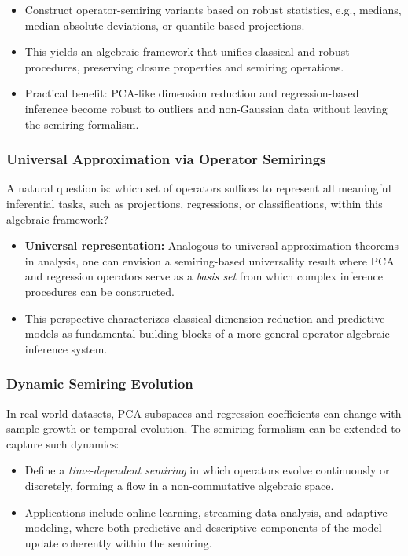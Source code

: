 \begin{itemize}
    \item Construct operator-semiring variants based on robust statistics, e.g., medians, median absolute deviations, or quantile-based projections.
    \item This yields an algebraic framework that unifies classical and robust procedures, preserving closure properties and semiring operations.
    \item Practical benefit: PCA-like dimension reduction and regression-based inference become robust to outliers and non-Gaussian data without leaving the semiring formalism.
\end{itemize}

\subsubsection{Universal Approximation via Operator Semirings}

A natural question is: which set of operators suffices to represent all meaningful inferential tasks, such as projections, regressions, or classifications, within this algebraic framework?  

\begin{itemize}
    \item \textbf{Universal representation:} Analogous to universal approximation theorems in analysis, one can envision a semiring-based universality result where PCA and regression operators serve as a \emph{basis set} from which complex inference procedures can be constructed.
    \item This perspective characterizes classical dimension reduction and predictive models as fundamental building blocks of a more general operator-algebraic inference system.
\end{itemize}

\subsubsection{Dynamic Semiring Evolution}

In real-world datasets, PCA subspaces and regression coefficients can change with sample growth or temporal evolution. The semiring formalism can be extended to capture such dynamics:

\begin{itemize}
    \item Define a \emph{time-dependent semiring} in which operators evolve continuously or discretely, forming a flow in a non-commutative algebraic space.
    \item Applications include online learning, streaming data analysis, and adaptive modeling, where both predictive and descriptive components of the model update coherently within the semiring.
\end{itemize}

